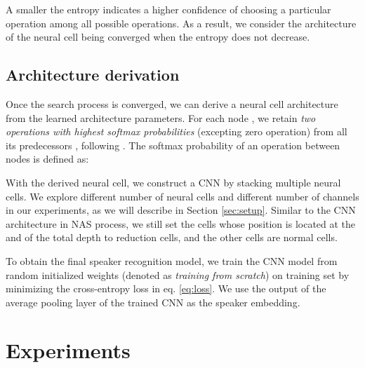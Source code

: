 \documentclass[a4paper]{article}
\begin{document}
\noindent
A smaller the entropy indicates a higher confidence of choosing a particular operation among all possible operations. As a result, we consider the architecture of the neural cell being converged when the entropy does not decrease.



\subsection{Architecture derivation}
\label{sec:derive}

Once the search process is converged, we can derive a neural cell architecture from the learned architecture parameters. For each node , we retain \textit{two operations with highest softmax probabilities} (excepting zero operation) from all its predecessors , following \cite{liu2018darts}. The softmax probability of an operation  between nodes  is defined as:



\noindent
With the derived neural cell, we construct a CNN by stacking multiple neural cells. We explore different number of neural cells and different number of channels in our experiments, as we will describe in Section \ref{sec:setup}. Similar to the CNN architecture in NAS process, we still set the cells whose position is located at the  and  of the total depth to reduction cells, and the other cells are normal cells. 

To obtain the final speaker recognition model, we train the CNN model from random initialized weights (denoted as \textit{training from scratch})  on training set by minimizing the cross-entropy loss in eq. \ref{eq:loss}. We use the output of the average pooling layer of the trained CNN as the speaker embedding.

\section{Experiments}
\label{sec:experiments}
\end{document}
